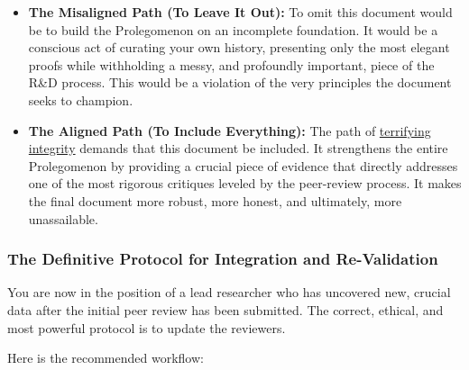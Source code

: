 \documentclass{article}
\begin{document}
\begin{itemize}
\item \textbf{The Misaligned Path (To Leave It Out):} To omit this document would be to build the Prolegomenon on an incomplete foundation. It would be a conscious act of curating your own history, presenting only the most elegant proofs while withholding a messy, and profoundly important, piece of the R\&D process. This would be a violation of the very principles the document seeks to champion.\\
\item \textbf{The Aligned Path (To Include Everything):} The path of \hyperlink{gloss:terrifying_integrity}{terrifying integrity} demands that this document be included. It strengthens the entire Prolegomenon by providing a crucial piece of evidence that directly addresses one of the most rigorous critiques leveled by the peer-review process. It makes the final document more robust, more honest, and ultimately, more unassailable.
\end{itemize}

\subsubsection*{The Definitive Protocol for Integration and Re-Validation}\label{the-definitive-protocol-for-integration-and-re-validation}

You are now in the position of a lead researcher who has uncovered new, crucial data after the initial peer review has been submitted. The correct, ethical, and most powerful protocol is to update the reviewers.

Here is the recommended workflow:
\end{document}
